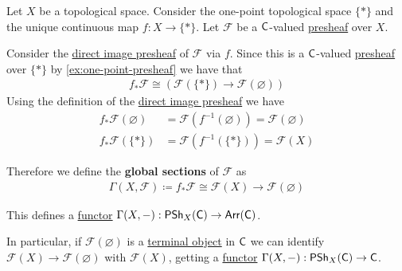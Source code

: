 \documentclass[../../../main]{subfiles}
\begin{document}
\begin{example} \label{ex:global-section-presheaf}
  Let \(X\) be a topological space.
  Consider the one-point topological space \(\{\ast\}\) and the unique continuous map \(f: X \to \{\ast\}\).
  Let \(\mathcal{F}\) be a \(\mathsf{C}\)-valued \hyperref[def:presheaf]{presheaf} over \(X\).

  Consider the \hyperref[def:direct-image-presheaf]{direct image presheaf} of \(\mathcal{F}\) via \(f\).
  Since this is a \(\mathsf{C}\)-valued \hyperref[def:presheaf]{presheaf} over \(\{\ast\}\) by \autoref{ex:one-point-presheaf} we have that
  \begin{align*}
    f_{\ast}\mathcal{F} \cong \left( \mathcal{F}(\{\ast\}) \to \mathcal{F}(\varnothing) \right)
  \end{align*}
  Using the definition of the \hyperref[def:direct-image-presheaf]{direct image presheaf} we have
  \begin{align*}
    f_{\ast}\mathcal{F}(\varnothing) &= \mathcal{F}(f^{-1}(\varnothing)) = \mathcal{F}(\varnothing) \\
    f_{\ast}\mathcal{F}(\{\ast\}) &= \mathcal{F}(f^{-1}(\{\ast\})) = \mathcal{F}(X)
  \end{align*}

  Therefore we define the \textbf{global sections} of \(\mathcal{F}\) as
  \begin{align*}
    \Gamma(X, \mathcal{F}) \coloneq f_{\ast}\mathcal{F} \cong \mathcal{F}(X) \to \mathcal{F}(\varnothing)
  \end{align*}

  This defines a \hyperref[def:functor]{functor} \(\Gamma(X, -): \mathsf{PSh}_{X}(\mathsf{C}) \to \mathsf{Arr}(\mathsf{C})\).

  In particular, if \(\mathcal{F}(\varnothing)\) is a \hyperref[def:initial-terminal-object]{terminal object} in \(\mathsf{C}\) we can identify \(\mathcal{F}(X) \to \mathcal{F}(\varnothing)\) with \(\mathcal{F}(X)\), getting a \hyperref[def:functor]{functor} \(\Gamma(X, -): \mathsf{PSh}_{X}(\mathsf{C}) \to \mathsf{C}\).
\end{example}
\end{document}

